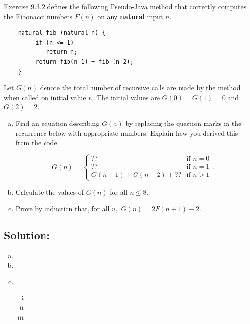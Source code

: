 \documentclass[12pt]{article}
\begin{document}
Exercise 9.3.2 defines the following Pseudo-Java method that correctly computes the Fibonacci numbers $F(n)$ on any {\bf natural} input $n.$

\begin{verbatim}
    natural fib (natural n) {
         if (n <= 1) 
            return n;
         return fib(n-1) + fib (n-2);
    }
\end{verbatim}

Let $G(n)$ denote the total number of recursive calls are made by the method when called on initial value $n$.   The initial values are $G(0)=G(1)=0$ and $G(2)=2$.

 \begin{enumerate}[(a)]
   

    \item Find an equation describing $G(n)$ by replacing the question marks in the recurrence below with appropriate numbers.  Explain how you derived this from the code.

    \begin{equation} \label{eq:9.3.2b}
    G(n) = \begin{cases} 
      ?? & \mbox{if $n=0$} \\
      ?? & \mbox{if $n=1$} \\
      G(n - 1) + G(n - 2) +  ??& \mbox{if $n>1$}
   \end{cases}.
\end{equation}

     \item  Calculate the values of $G(n)$ for all $n \le 8.$




     
     \item  Prove by induction  that, for all $n,$  $G(n) = 2F(n+1) - 2$.
 \end{enumerate}


 \subsection*{\textbf{Solution:}}
 \begin{enumerate}[(a)]
    \item 
    \item
    \item \ 
        \begin{enumerate}[(i)]
            \item 
            \item 
            \item 
        \end{enumerate}
\end{enumerate}
\end{document}
